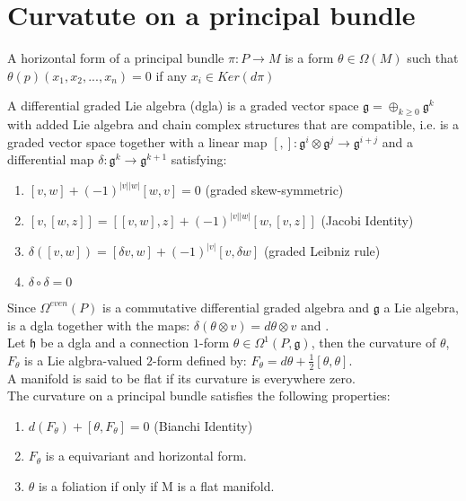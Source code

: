 \section{Curvatute on a principal bundle}
\begin{definition}
	A horizontal form of a principal bundle $\pi: P \to M$ is a form $\theta \in \Omega(M)$ such that $\theta(p)(x_1,x_2,...,x_n)=0$ if any $x_i \in Ker(d\pi)$
\end{definition}
\begin{definition}
	A differential graded  Lie algebra (dgla) is a graded vector space $\mathfrak{g} =\oplus_{k \geqslant 0} \mathfrak{g}^{k}$ with added Lie algebra and chain complex structures that are compatible, i.e. is a graded vector space together with a linear map $[,]:\mathfrak{g}^{i} \otimes \mathfrak{g}^{j} \to \mathfrak{g}^{i+j} $ and a differential map $\delta: \mathfrak{g}^{k}\to \mathfrak{g}^{k+1}$ satisfying:
	\begin{enumerate}[i]
		\item $[v,w]+(-1)^{|v||w|}[w,v] =0$ (graded skew-symmetric)
		\item $[v,[w,z]]=[[v,w],z]+(-1)^{|v||w|}[w,[v,z]]$ (Jacobi Identity)
		\item $\delta([v,w])=[\delta v, w]+(-1)^{|v|}[v, \delta w]$ (graded Leibniz rule)
		\item $\delta \circ \delta=0$
	\end{enumerate}
\end{definition}

Since $\Omega^{even}(P)$ is a commutative differential graded algebra and $\mathfrak{g}$ a Lie algebra,  is a dgla together with the maps: $\delta(\theta \otimes v)=d\theta \otimes v$ and .\\

 Let $\mathfrak{h}$ be a dgla and a connection $1$-form $\theta \in \Omega^{1}(P, \mathfrak{g})$, then the curvature of $\theta$, $F_{\theta}$ is a Lie algbra-valued $2$-form defined by: $F_{\theta}=d\theta+\frac{1}{2}[\theta,\theta]$.\\
 A manifold is said to be flat if its curvature is everywhere zero.\\
 
 The curvature on a principal bundle  satisfies the following properties:
 \begin{enumerate}[i]
 	\item $d(F_{\theta})+[\theta,F_{\theta}]=0$ (Bianchi Identity)
 	\item $F_{\theta}$ is a equivariant and horizontal form.
 	\item $\theta$ is a foliation if only if M is a flat manifold.
 
  \end{enumerate}

